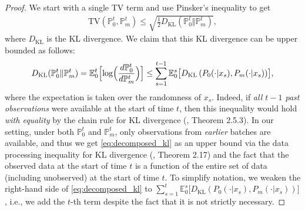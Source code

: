 \documentclass[10pt]{article}
\begin{document}
\begin{proof}
    We start with a single TV term and use Pinsker's inequality to get
    \begin{align}
        \mathrm{TV}(\mathbb{P}_0^{t}, \mathbb{P}_m^{t}) \leq \sqrt{\frac{1}{2}D_{\mathrm{KL}}(\mathbb{P}_0^{t}\Vert \mathbb{P}_m^{t})}, \label{eq:tv_to_kl}
    \end{align}
    where $D_{\mathrm{KL}}$ is the KL divergence. 
    We claim that this KL divergence can be upper bounded as follows:
    \begin{align}
        D_{\mathrm{KL}}(\mathbb{P}_0^{t}\Vert \mathbb{P}_m^{t})
        = \mathbb{E}_0^t\Bigl[ \log\Bigl(\frac{d\mathbb{P}^t_0}{d\mathbb{P}^t_m}\Bigr) \Bigr]
        \leq \sum_{s=1}^{t-1} \mathbb{E}_0^s\bigl[ D_{\mathrm{KL}}\left(P_0(\cdot|x_s), P_m(\cdot|x_s)\right) \bigr] \label{eq:decomposed_kl},
    \end{align}
    where the expectation is taken over the randomness of $x_s$.  Indeed, if \emph{all $t-1$ past observations} were available at the start of time $t$, then this inequality would hold \emph{with equality} by the chain rule for KL divergence (\cite{Cover06}, Theorem 2.5.3).  In our setting, under both $\mathbb{P}_0^t$ and $\mathbb{P}_m^t$, only observations from \emph{earlier} batches are available, and thus we get \eqref{eq:decomposed_kl} as an upper bound via the data processing inequality for KL divergence (\cite{Polyanskiy25}, Theorem 2.17) and the fact that the observed data at the start of time $t$ is a function of the entire set of data (including unobserved) at the start of time $t$. To simplify notation, we weaken the right-hand side of \eqref{eq:decomposed_kl} to $\sum_{s=1}^{t} \mathbb{E}_0^s\bigl[ D_{\mathrm{KL}}\left(P_0(\cdot|x_s), P_m(\cdot|x_s)\right) \bigr]$, i.e., we add the $t$-th term despite the fact that it is not strictly necessary.
    

\end{proof}
\end{document}

